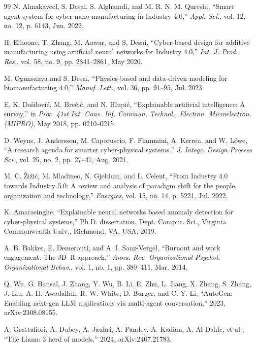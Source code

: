 \documentclass[a4paper,fleqn]{cas-dc}
\begin{document}
\begin{thebibliography}{99}
N. Almakayeel, S. Desai, S. Alghamdi, and M. R. N. M. Qureshi, ``Smart agent system for cyber nano-manufacturing in Industry 4.0,'' \emph{Appl. Sci.}, vol. 12, no. 12, p. 6143, Jun. 2022.

H. Elhoone, T. Zhang, M. Anwar, and S. Desai, ``Cyber-based design for additive manufacturing using artificial neural networks for Industry 4.0,'' \emph{Int. J. Prod. Res.}, vol. 58, no. 9, pp. 2841--2861, May 2020.

M. Ogunsanya and S. Desai, ``Physics-based and data-driven modeling for biomanufacturing 4.0,'' \emph{Manuf. Lett.}, vol. 36, pp. 91--95, Jul. 2023.

E. K. Do\v{s}ilovi\'{c}, M. Bre\v{c}i\'{c}, and N. Hlupi\'{c}, ``Explainable artificial intelligence: A survey,'' in \emph{Proc. 41st Int. Conv. Inf. Commun. Technol., Electron. Microelectron. (MIPRO)}, May 2018, pp. 0210--0215.

D. Weyns, J. Andersson, M. Caporuscio, F. Flammini, A. Kerren, and W. L\"{o}we, ``A research agenda for smarter cyber-physical systems,'' \emph{J. Integr. Design Process Sci.}, vol. 25, no. 2, pp. 27--47, Aug. 2021.

M. C. \v{Z}i\v{z}i\'{c}, M. Mladineo, N. Gjeldum, and L. Celent, ``From Industry 4.0 towards Industry 5.0: A review and analysis of paradigm shift for the people, organization and technology,'' \emph{Energies}, vol. 15, no. 14, p. 5221, Jul. 2022.

K. Amarasinghe, ``Explainable neural networks based anomaly detection for cyber-physical systems,'' Ph.D. dissertation, Dept. Comput. Sci., Virginia Commonwealth Univ., Richmond, VA, USA, 2019.

A. B. Bakker, E. Demerouti, and A. I. Sanz-Vergel, ``Burnout and work engagement: The JD--R approach,'' \emph{Annu. Rev. Organizational Psychol. Organizational Behav.}, vol. 1, no. 1, pp. 389--411, Mar. 2014.


Q. Wu, G. Bansal, J. Zhang, Y. Wu, B. Li, E. Zhu, L. Jiang, X. Zhang, S. Zhang, J. Liu, A. H. Awadallah, R. W. White, D. Burger, and C.-Y. Li, ``AutoGen: Enabling next-gen LLM applications via multi-agent conversation,'' 2023, arXiv:2308.08155.

A. Grattafiori, A. Dubey, A. Jauhri, A. Pandey, A. Kadian, A. Al-Dahle, et al., ``The Llama 3 herd of models,'' 2024, arXiv:2407.21783.


\end{thebibliography}
\end{document}
